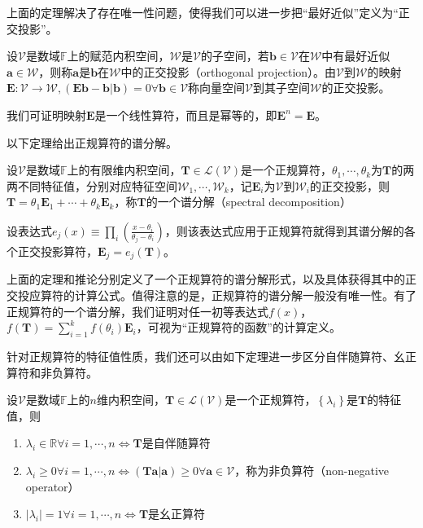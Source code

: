 \documentclass[main.tex]{subfiles}
\begin{document}
上面的定理解决了存在唯一性问题，使得我们可以进一步把“最好近似”定义为“正交投影”。

\begin{definition}[正交投影算符]
设$\mathcal{V}$是数域$\mathbb{F}$上的赋范内积空间，$\mathcal{W}$是$\mathcal{V}$的子空间，若$\mathbf{b}\in\mathcal{V}$在$\mathcal{W}$中有最好近似$\mathbf{a}\in\mathcal{W}$，则称$\mathbf{a}$是$\mathbf{b}$在$\mathcal{W}$中的正交投影（orthogonal projection）。由$\mathcal{V}$到$\mathcal{W}$的映射$\mathbf{E}:\mathcal{V}\rightarrow\mathcal{W},\left(\mathbf{Eb}-\mathbf{b}|\mathbf{b}\right)=0\forall\mathbf{b}\in\mathcal{V}$称向量空间$\mathcal{V}$到其子空间$\mathcal{W}$的正交投影。
\end{definition}

我们可证明映射$\mathbf{E}$是一个线性算符，而且是幂等的，即$\mathbf{E}^n=\mathbf{E}$。

以下定理给出正规算符的谱分解。

\begin{theorem}
设$\mathcal{V}$是数域$\mathbb{F}$上的有限维内积空间，$\mathbf{T}\in\mathcal{L}\left(\mathcal{V}\right)$是一个正规算符，$\theta_1,\cdots,\theta_k$为$\mathbf{T}$的两两不同特征值，分别对应特征空间$\mathcal{W}_1,\cdots,\mathcal{W}_k$，记$\mathbf{E}_i$为$\mathcal{V}$到$\mathcal{W}_i$的正交投影，则$\mathbf{T}=\theta_1\mathbf{E}_1+\cdots+\theta_k\mathbf{E}_k$，称$\mathbf{T}$的一个谱分解（spectral decomposition）
\end{theorem}

\begin{corollary}
设表达式$e_j\left(x\right)\equiv\prod_{i}\left(\frac{x-\theta_i}{\theta_j-\theta_i}\right)$，则该表达式应用于正规算符就得到其谱分解的各个正交投影算符，$\mathbf{E}_j=e_j\left(\mathbf{T}\right)$。
\end{corollary}

上面的定理和推论分别定义了一个正规算符的谱分解形式，以及具体获得其中的正交投应算符的计算公式。值得注意的是，正规算符的谱分解一般没有唯一性。有了正规算符的一个谱分解，我们证明对任一初等表达式$f\left(x\right)$，$f\left(\mathbf{T}\right)=\sum_{i=1}^kf\left(\theta_i\right)\mathbf{E}_i$，可视为“正规算符的函数”的计算定义。

针对正规算符的特征值性质，我们还可以由如下定理进一步区分自伴随算符、幺正算符和非负算符。

\begin{theorem}
设$\mathcal{V}$是数域$\mathbb{F}$上的$n$维内积空间，$\mathbf{T}\in\mathcal{L}\left(\mathcal{V}\right)$是一个正规算符，$\left\{\lambda_i\right\}$是$\mathbf{T}$的特征值，则
\begin{enumerate}
    \item $\lambda_i\in\mathbb{R}\forall i=1,\cdots,n\Leftrightarrow\mathbf{T}$是自伴随算符
    \item $\lambda_i\geq 0\forall i=1,\cdots,n\Leftrightarrow\left(\mathbf{Ta}|\mathbf{a}\right)\geq0\forall\mathbf{a}\in\mathcal{V}$，称为非负算符（non-negative operator）
    \item $\left|\lambda_i\right|=1\forall i=1,\cdots,n\Leftrightarrow\mathbf{T}$是幺正算符
\end{enumerate}
\end{theorem}
\end{document}
